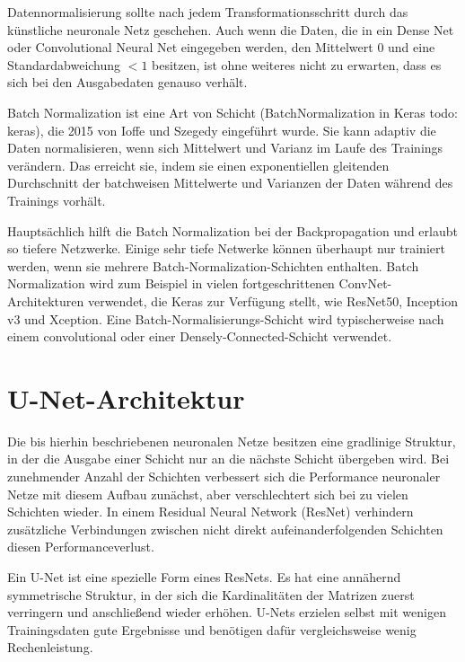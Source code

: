Datennormalisierung sollte nach jedem Transformationsschritt durch das künstliche neuronale Netz geschehen. Auch wenn die Daten, die in ein Dense Net oder Convolutional Neural Net eingegeben werden, den Mittelwert $0$ und eine Standardabweichung $< 1$ besitzen, ist ohne weiteres nicht zu erwarten, dass es sich bei den Ausgabedaten genauso verhält.

Batch Normalization ist eine Art von Schicht (BatchNormalization in Keras todo: keras), die 2015 von Ioffe und Szegedy \cite{todo: cite https://arxiv.org/abs/1502.03167.} eingeführt wurde. Sie kann adaptiv die Daten normalisieren, wenn sich Mittelwert und Varianz im Laufe des Trainings verändern. Das erreicht sie, indem sie einen exponentiellen gleitenden Durchschnitt der batchweisen Mittelwerte und Varianzen der Daten während des Trainings vorhält.

Hauptsächlich hilft die Batch Normalization bei der Backpropagation und erlaubt so tiefere Netzwerke. Einige sehr tiefe Netwerke können überhaupt nur trainiert werden, wenn sie mehrere Batch-Normalization-Schichten enthalten. Batch Normalization wird zum Beispiel in vielen fortgeschrittenen ConvNet-Architekturen verwendet, die Keras zur Verfügung stellt, wie ResNet50, Inception v3 und Xception. Eine Batch-Normalisierungs-Schicht wird typischerweise nach einem convolutional oder einer Densely-Connected-Schicht verwendet.
\cite{chollet2021deep}

\section{U-Net-Architektur}
\label{sec:unet}
Die bis hierhin beschriebenen neuronalen Netze besitzen eine gradlinige Struktur, in der die Ausgabe einer Schicht nur an die nächste Schicht übergeben wird. Bei zunehmender Anzahl der Schichten verbessert sich die Performance neuronaler Netze mit diesem Aufbau zunächst, aber verschlechtert sich bei zu vielen Schichten wieder. In einem Residual Neural Network (ResNet) verhindern zusätzliche Verbindungen zwischen nicht direkt aufeinanderfolgenden Schichten diesen Performanceverlust.

Ein U-Net ist eine spezielle Form eines ResNets. Es hat eine annähernd symmetrische Struktur, in der sich die Kardinalitäten der Matrizen zuerst verringern und anschließend wieder erhöhen. U-Nets erzielen selbst mit wenigen Trainingsdaten gute Ergebnisse und benötigen dafür vergleichsweise wenig Rechenleistung. \cite{he2015deep}

